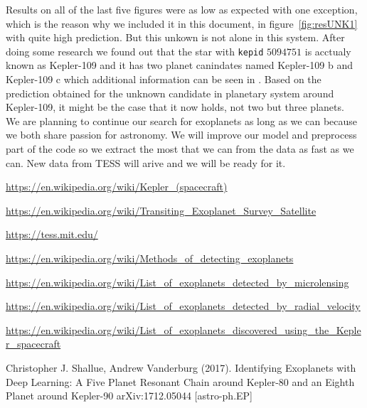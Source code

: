 \documentclass[twoside]{article}
\newcommand{\code}[1]{\texttt{#1}}
\begin{document}
\begin{multicols}{2}
Results on all of the last five figures were as low as expected with one exception, which is the reason why we included it in this document, in figure~\ref{fig:resUNK1} with quite high prediction. But this unkown is not alone in this system. After doing some research we found out that the star with \code{kepid} $5094751$ is acctualy known as Kepler-109 and it has two planet canindates named Kepler-109 b and Kepler-109 c which additional information can be seen in \cite{oExoCat}. Based on the prediction obtained for the unknown candidate in planetary system around Kepler-109, it might be the case that it now holds, not two but three planets. 
\\
We are planning to continue our search for exoplanets as long as we can because we both share passion for astronomy. We will improve our model and preprocess part of the code so we extract the most that we can from the data as fast as we can. New data from TESS will arive and we will be ready for it. 

\begin{thebibliography}{99}

\url{https://en.wikipedia.org/wiki/Kepler_(spacecraft)}

\url{https://en.wikipedia.org/wiki/Transiting_Exoplanet_Survey_Satellite}

\url{https://tess.mit.edu/}

\url{https://en.wikipedia.org/wiki/Methods_of_detecting_exoplanets}

\url{https://en.wikipedia.org/wiki/List_of_exoplanets_detected_by_microlensing}

\url{https://en.wikipedia.org/wiki/List_of_exoplanets_detected_by_radial_velocity}

\url{https://en.wikipedia.org/wiki/List_of_exoplanets_discovered_using_the_Kepler_spacecraft}

Christopher J. Shallue, Andrew Vanderburg (2017).
\newblock Identifying Exoplanets with Deep Learning: A Five Planet Resonant Chain around Kepler-80 and an Eighth Planet around Kepler-90
\newblock arXiv:1712.05044 [astro-ph.EP]


\end{thebibliography}
\end{multicols}
\end{document}
